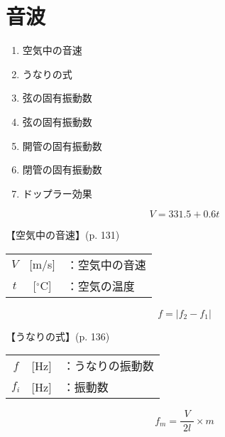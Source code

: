 \documentclass[10pt]{jarticle}
\begin{document}
\newpage
\addtocounter{page}{-1}
\thispagestyle{empty}
\section{音波}

\begin{enumerate}
\setcounter{enumi}{\thepage}
\small
\itemsep-4mm
\item 空気中の音速\\
\item うなりの式\\
\item 弦の固有振動数\\
\item 弦の固有振動数\\
\item 開管の固有振動数\\
\item 閉管の固有振動数\\
\item ドップラー効果\\
\end{enumerate}
\newpage



\[
V = 331.5 + 0.6t
\]


\vskip3mm
【空気中の音速】{\footnotesize (p. 131)}

\begin{tabular}{ccl}
$V$	&[m/s]	&：空気中の音速\\
$t$	&[$^\circ$C]	&：空気の温度\\
\end{tabular}

\newpage





\[
f = |f_2 - f_1|
\]


\vskip3mm
【うなりの式】{\footnotesize (p. 136)}

\begin{tabular}{ccl}
$f$	&[Hz]	&：うなりの振動数\\
$f_i$	&[Hz]	&：振動数\\
\end{tabular}

\newpage




\[
f_m = \frac{V}{\; 2l \;}\times m
\]
\end{document}
